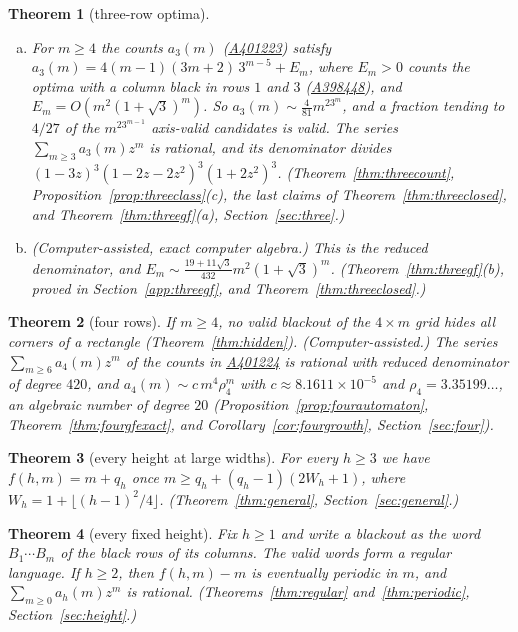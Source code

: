 \documentclass[12pt]{article}
\theoremstyle{plain}
\newtheorem{introthm}{Theorem}
\theoremstyle{definition}
\theoremstyle{remark}
\newcommand{\seqnum}[1]{\href{https://oeis.org/#1}{\rm \underline{#1}}}
\begin{document}
\begin{introthm}[three-row optima]\label{thm:B}
\leavevmode
\begin{enumerate}[(a)]
\item For $m\ge4$ the counts $a_3(m)$ \textup{(}\seqnum{A401223}\textup{)} satisfy $a_3(m)=4(m-1)(3m+2)\,3^{m-5}+E_m$, where $E_m>0$ counts the
optima with a column black in rows $1$ and $3$ (\seqnum{A398448}), and
$E_m=O(m^2(1+\sqrt3)^m)$. So $a_3(m)\sim\frac4{81}m^23^m$, and a fraction tending to $4/27$
of the $m^23^{m-1}$ axis-valid candidates is valid. The series $\sum_{m\ge3}a_3(m)z^m$ is
rational, and its denominator divides $(1-3z)^3(1-2z-2z^2)^3(1+2z^2)^3$.
\textup{(Theorem~\ref{thm:threecount}, Proposition~\ref{prop:threeclass}(c), the last claims of
Theorem~\ref{thm:threeclosed}, and Theorem~\ref{thm:threegf}(a), Section~\ref{sec:three}.)}
\item (Computer-assisted, exact computer algebra.) This is the reduced denominator,
and $E_m\sim\frac{19+11\sqrt3}{432}m^2(1+\sqrt3)^m$. \textup{(Theorem~\ref{thm:threegf}(b),
proved in Section~\ref{app:threegf}, and Theorem~\ref{thm:threeclosed}.)}
\end{enumerate}
\end{introthm}

\begin{introthm}[four rows]\label{thm:C}
If $m\ge4$, no valid blackout of the $4\times m$ grid hides all corners of a
rectangle \textup{(Theorem~\ref{thm:hidden})}. (Computer-assisted.) The series
$\sum_{m\ge6}a_4(m)z^m$ of the counts in \seqnum{A401224} is rational with reduced denominator of degree $420$, and
$a_4(m)\sim c\,m^4\rho_4^m$ with $c\approx8.1611\times10^{-5}$ and $\rho_4=3.35199\ldots$, an
algebraic number of degree $20$ \textup{(Proposition~\ref{prop:fourautomaton},
Theorem~\ref{thm:fourgfexact}, and Corollary~\ref{cor:fourgrowth}, Section~\ref{sec:four})}.
\end{introthm}

\begin{introthm}[every height at large widths]\label{thm:D}
For every $h\ge3$ we have $f(h,m)=m+q_h$ once $m\ge q_h+(q_h-1)(2W_h+1)$, where
$W_h=1+\lfloor(h-1)^2/4\rfloor$. \textup{(Theorem~\ref{thm:general},
Section~\ref{sec:general}.)}
\end{introthm}

\begin{introthm}[every fixed height]\label{thm:E}
Fix $h\ge1$ and write a blackout as the word $B_1\cdots B_m$ of the black rows of its
columns. The valid words form a regular language. If $h\ge2$, then $f(h,m)-m$ is
eventually periodic in $m$, and $\sum_{m\ge0}a_h(m)z^m$ is rational.
\textup{(Theorems~\ref{thm:regular} and~\ref{thm:periodic}, Section~\ref{sec:height}.)}
\end{introthm}
\end{document}
